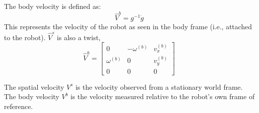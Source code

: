 The body velocity is defined as:
\[
    \hat{V}^{b} = g^{-1} \dot{g}
\]
This represents the velocity of the robot as seen in the body frame (i.e., attached to the robot).
\( \hat{V}^{s} \) is also a twist,
\[
    \hat{V}^{b} = \begin{bmatrix}
        0            & -\omega^{(b)} & v_x^{(b)} \\
        \omega^{(b)} & 0             & v_y^{(b)} \\
        0            & 0             & 0
    \end{bmatrix}
\]

The spatial velocity \( V^s \) is the velocity observed from a stationary world frame.
The body velocity \( V^b \) is the velocity measured relative to the robot's own frame of reference.
